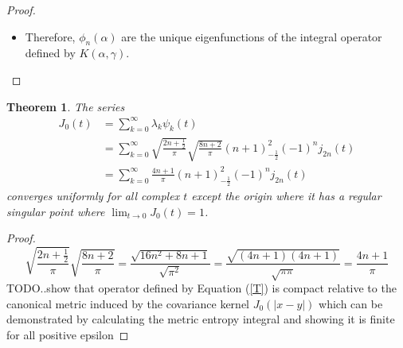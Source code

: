 \documentclass{article}
\newtheorem{theorem}{Theorem}
\begin{document}
\begin{proof}
\begin{enumerate}
\begin{itemize}
\item Therefore, $\phi_n (\alpha)$ are the unique eigenfunctions of the
integral operator defined by $K (\alpha, \gamma)$.
\end{itemize}
\end{enumerate}
\end{proof}

\begin{theorem}
The series
\begin{equation}
\begin{array}{ll}
J_0 (t) & = \sum_{k = 0 }^{\infty} \lambda_k \psi_k (t)\\
& = \sum_{k = 0 }^{\infty} \sqrt{\frac{2 n + \frac{1}{2}}{\pi}} 
\sqrt{\frac{8 n + 2}{\pi}} (n + 1)_{- \frac{1}{2}}^2 (- 1)^n j_{2 n}
(t)\\
& = \sum_{k = 0 }^{\infty} \frac{4 n + 1}{\pi} (n + 1)_{-
\frac{1}{2}}^2 (- 1)^n j_{2 n} (t)
\end{array}
\end{equation}
converges uniformly for all complex $t$ except the origin where it has a
regular singular point where $\lim_{t \rightarrow 0} J_0 (t) = 1$.
\end{theorem}

\begin{proof}

\begin{equation}
\sqrt{\frac{2 n + \frac{1}{2}}{\pi}} \sqrt{\frac{8 n + 2}{\pi}} =
\frac{\sqrt{16 n^2 + 8 n + 1}}{\sqrt{\pi^2}} = \frac{\sqrt{(4 n + 1) (4 n
+ 1)}}{\sqrt{\pi \pi}} = \frac{4 n + 1}{\pi}
\end{equation}
TODO..show that operator defined by Equation (\ref{T}) is compact relative
to the canonical metric induced by the covariance kernel $J_0 (| x - y |)$
which can be demonstrated by calculating the metric entropy integral and
showing it is finite for all positive epsilon
\end{proof}
\end{document}

